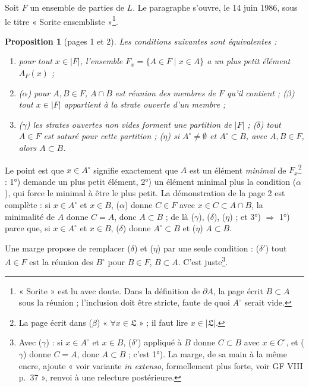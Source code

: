 \documentclass[11pt,a4paper]{article}
\begin{document}
Soit $F$ un ensemble de parties de $L$. Le paragraphe s'ouvre, le
14 juin 1986, sous le titre « Sorite ensembliste »\footnote{« Sorite » est lu
avec doute. Dans la définition de $\partial A$, la page écrit $B \subset A$ sous
la réunion ; l'inclusion doit être stricte, faute de quoi $A^{\circ}$ serait
vide.}.

\textbf{Proposition 1} (pages 1 et 2). \emph{Les conditions suivantes sont
équivalentes :}
\begin{enumerate}
\item[1°)] \emph{pour tout $x \in |F|$, l'ensemble $F_{x} = \{A \in F \mid x \in
A\}$ a un plus petit élément $A_{F}(x)$ ;}
\item[2°)] \emph{($\alpha$) pour $A, B \in F$, $A \cap B$ est réunion des
membres de $F$ qu'il contient ; ($\beta$) tout $x \in |F|$ appartient à la
strate ouverte d'un membre ;}
\item[3°)] \emph{($\gamma$) les strates ouvertes non vides forment une
partition de $|F|$ ; ($\delta$) tout $A \in F$ est saturé pour cette
partition ; ($\eta$) si $A^{\circ} \neq \emptyset$ et $A^{\circ} \subset B$,
avec $A, B \in F$, alors $A \subset B$.}
\end{enumerate}

Le point est que $x \in A^{\circ}$ signifie exactement que $A$ est un élément
\emph{minimal} de $F_{x}$\footnote{La page écrit dans ($\beta$) « $\forall x \in
\mathfrak{L}$ » ; il faut lire $x \in |\mathfrak{L}|$.} : 1°) demande un plus
petit élément, 2°) un élément minimal plus la condition ($\alpha$), qui force
le minimal à être le plus petit. La démonstration de la page 2 est complète :
si $x \in A^{\circ}$ et $x \in B$, ($\alpha$) donne $C \in F$ avec $x \in C
\subset A \cap B$, la minimalité de $A$ donne $C = A$, donc $A \subset B$ ; de
là ($\gamma$), ($\delta$), ($\eta$) ; et 3°) $\Rightarrow$ 1°) parce que, si
$x \in A^{\circ}$ et $x \in B$, ($\delta$) donne $A^{\circ} \subset B$ et
($\eta$) $A \subset B$.

Une marge propose de remplacer ($\delta$) et ($\eta$) par une seule condition :
($\delta'$) tout $A \in F$ est la réunion des $B^{\circ}$ pour $B \in F$, $B
\subset A$. C'est juste\footnote{Avec ($\gamma$) : si $x \in A^{\circ}$ et $x
\in B$, ($\delta'$) appliqué à $B$ donne $C \subset B$ avec $x \in C^{\circ}$,
et ($\gamma$) donne $C = A$, donc $A \subset B$ ; c'est 1°). La marge, de sa
main à la même encre, ajoute « voir variante \emph{in extenso}, formellement
plus forte, voir GF VIII p.~37 », renvoi à une relecture postérieure.}.
\end{document}
